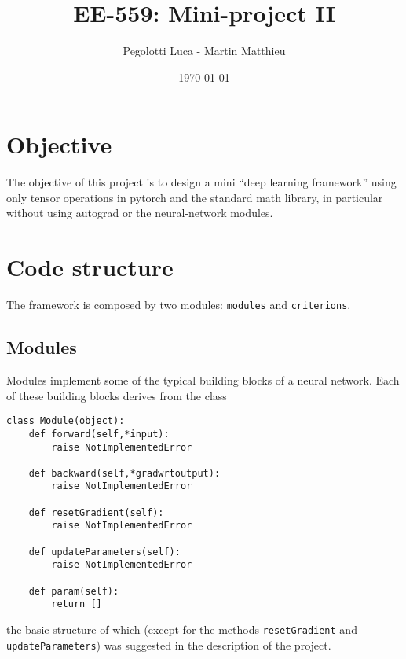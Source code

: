 \documentclass[10pt,final,a4paper]{article}
\begin{document}
\title{EE-559: Mini-project II}
\author{Pegolotti Luca - Martin Matthieu}

\date{\today}
\maketitle


\section{Objective}

The objective of this project is to design a mini “deep learning framework” using only tensor operations in pytorch and the standard math library, in particular without using autograd or the neural-network modules. 

\section{Code structure}
The framework is composed by two modules: \verb|modules| and \verb|criterions|.
\subsection{Modules}
Modules implement some of the typical building blocks of a neural network. Each of these building blocks derives from the class
\begin{verbatim}
class Module(object):
    def forward(self,*input):
        raise NotImplementedError

    def backward(self,*gradwrtoutput):
        raise NotImplementedError

    def resetGradient(self):
        raise NotImplementedError

    def updateParameters(self):
        raise NotImplementedError

    def param(self):
        return []
\end{verbatim}
the basic structure of which (except for the methods \verb|resetGradient| and \verb|updateParameters|) was suggested in the description of the project.
\end{document}
